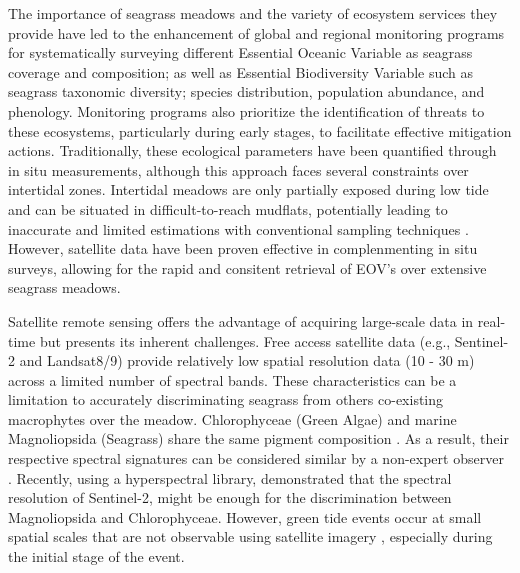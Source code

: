 \documentclass[
  number]{elsarticle}
\begin{document}
The importance of seagrass meadows and the variety of ecosystem services
they provide have led to the enhancement of global and regional
monitoring programs for systematically surveying different Essential
Oceanic Variable \citep{Miloslavich2018} as seagrass coverage and
composition; as well as Essential Biodiversity Variable
\citep{Pereira2013} such as seagrass taxonomic diversity; species
distribution, population abundance, and phenology. Monitoring programs
also prioritize the identification of threats to these ecosystems,
particularly during early stages, to facilitate effective mitigation
actions. Traditionally, these ecological parameters have been quantified
through in situ measurements, although this approach faces several
constraints over intertidal zones. Intertidal meadows are only partially
exposed during low tide and can be situated in difficult-to-reach
mudflats, potentially leading to inaccurate and limited estimations with
conventional sampling techniques \citep{nijland2019}. However, satellite
data have been proven effective in complenmenting in situ surveys,
allowing for the rapid and consitent retrieval of EOV's over extensive
seagrass meadows. \citetext{\citealp[ ]{Zoffoli2021}; \citealp[
]{xu2021}; \citealp[ ]{Traganos2018}; \citealp{coffer2023}}

Satellite remote sensing offers the advantage of acquiring large-scale
data in real-time but presents its inherent challenges. Free access
satellite data (e.g., Sentinel-2 and Landsat8/9) provide relatively low
spatial resolution data (10 - 30 m) across a limited number of spectral
bands. These characteristics can be a limitation to accurately
discriminating seagrass from others co-existing macrophytes over the
meadow. Chlorophyceae (Green Algae) and marine Magnoliopsida (Seagrass)
share the same pigment composition \citetext{\citealp[
]{ralph2002}; \citealp{Douay2022}}. As a result, their respective
spectral signatures can be considered similar by a non-expert observer
\citetext{\citealp[ ]{Davies2023}; \citealp{bannari2022}}. Recently,
using a hyperspectral library, \citep{Davies2023} demonstrated that the
spectral resolution of Sentinel-2, might be enough for the
discrimination between Magnoliopsida and Chlorophyceae. However, green
tide events occur at small spatial scales that are not observable using
satellite imagery \citep{tuya2013}, especially during the initial stage
of the event.
\end{document}
